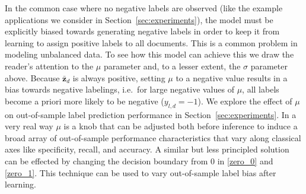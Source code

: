 
In the common case where no negative labels are observed (like the example applications we consider in Section~\ref{sec:experiments}), the model must be explicitly biased towards generating  negative labels in order to keep it from learning to assign positive labels to all documents.   This is a common problem in modeling unbalanced data.  To see how this model can achieve this we draw the reader's attention to the $\mu$ parameter and, to a lesser extent, the $\sigma$ parameter above.  Because $\bar{\mathbf{z}}_d$ is always positive, setting $\mu$ to a negative value results in a bias towards negative labelings, i.e.~for large negative values of $\mu$, all labels become a priori more likely to be negative ($y_{l,d}=-1$).  We explore the effect of $\mu$ on out-of-sample label prediction performance in Section~\ref{sec:experiments}.   In a very real way $\mu$ is a knob that can be adjusted both before inference to induce a broad array of out-of-sample performance characteristics that vary along classical axes like specificity, recall, and accuracy.  A similar but less principled solution can be effected by changing the decision boundary from $0$ in \eqref{zero_0} and \eqref{zero_1}.  This technique can be used to vary out-of-sample label bias after learning.



